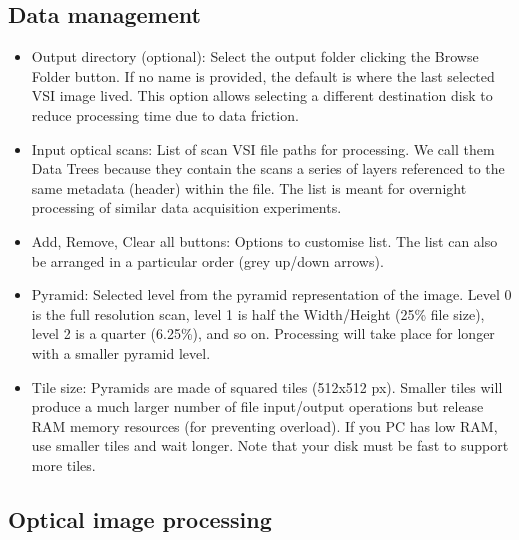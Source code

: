 	\subsection{Data management}
	
	\begin{itemize}		
		\item Output directory (optional): Select the output folder clicking the Browse Folder button. If no name is provided, the default is where the last selected VSI image lived. This option allows selecting a different destination disk to reduce processing time due to data friction.
		
		\item Input optical scans: List of scan VSI file paths for processing. We call them Data Trees because they contain the scans a series of layers referenced to the same metadata (header) within the file. The list is meant for overnight processing of similar data acquisition experiments.
		
		\item Add, Remove, Clear all buttons: Options to customise list. The list can also be arranged in a particular order (grey up/down arrows).
				
		\item Pyramid: Selected level from the pyramid representation of the image. Level 0 is the full resolution scan, level 1 is half the Width/Height (25\% file size), level 2 is a quarter (6.25\%), and so on. Processing will take place for longer with a smaller pyramid level.
		
		\item Tile size: Pyramids are made of squared tiles (512x512 px). Smaller tiles will produce a much larger number of file input/output operations but release RAM memory resources (for preventing overload). If you PC has low RAM, use smaller tiles and wait longer. Note that your disk must be fast to support more tiles.		
	\end{itemize}
	
	\subsection{Optical image processing}
	

